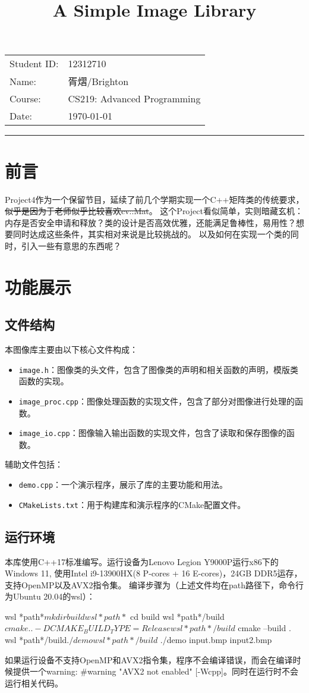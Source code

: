 \documentclass[11pt]{article}
\title{\textbf{A Simple Image Library} }
\author{}
\date{}
\makeatletter
\renewcommand{\maketitle}{
  \begin{center}
    {\LARGE \@title \par}
    \vspace{1em}
    \textbf{\@author}
    \vspace{1em}
    \begin{tabular}{ll}
      Student ID: & 12312710 \\
      Name:       & 胥熠/Brighton \\
      Course:     & CS219: Advanced Programming \\
      Date:       & \today
    \end{tabular}
    \vspace{0.5em}
    \hrule height 0.8pt
  \end{center}
}
\makeatother
\begin{document}
\thispagestyle{empty}
\maketitle

{
\tableofcontents
}
\vspace{3em}



\newpage %
\section{前言}
Project4作为一个保留节目，延续了前几个学期实现一个C++矩阵类的传统要求，\\
\sout{似乎是因为于老师似乎比较喜欢cv::Mat}。
这个Project看似简单，实则暗藏玄机：内存是否安全申请和释放？类的设计是否高效优雅，还能满足鲁棒性，易用性？想要同时达成这些条件，其实相对来说是比较挑战的。
以及如何在实现一个类的同时，引入一些有意思的东西呢？

\section{功能展示}
\subsection{文件结构}
本图像库主要由以下核心文件构成：
\begin{itemize}
  \item \texttt{image.h}：图像类的头文件，包含了图像类的声明和相关函数的声明，模版类函数的实现。
  \item \texttt{image\_proc.cpp}：图像处理函数的实现文件，包含了部分对图像进行处理的函数。
  \item \texttt{image\_io.cpp}：图像输入输出函数的实现文件，包含了读取和保存图像的函数。
\end{itemize}
辅助文件包括：
\begin{itemize}
    \item \texttt{demo.cpp}：一个演示程序，展示了库的主要功能和用法。
    \item \texttt{CMakeLists.txt}：用于构建库和演示程序的CMake配置文件。
\end{itemize}

\subsection{运行环境}
本库使用C++17标准编写。运行设备为Lenovo Legion Y9000P运行x86下的Windows 11, 使用Intel i9-13900HX(8 P-cores + 16 E-cores)，24GB DDR5运存，支持OpenMP以及AVX2指令集。
编译步骤为（上述文件均在path路径下，命令行为Ubuntu 20.04的wsl）：
\begin{commandline}
wsl *path*$ mkdir build
wsl *path*$ cd build
wsl *path*/build$ cmake .. -DCMAKE_BUILD_TYPE=Release
wsl *path*/build$ cmake --build .
wsl *path*/build$ ./demo 
wsl *path*/build$ ./demo input.bmp input2.bmp 
\end{commandline}
如果运行设备不支持OpenMP和AVX2指令集，程序不会编译错误，而会在编译时候提供一个warning: \#warning "AVX2 not enabled" [-Wcpp]。同时在运行时不会运行相关代码。
\end{document}

